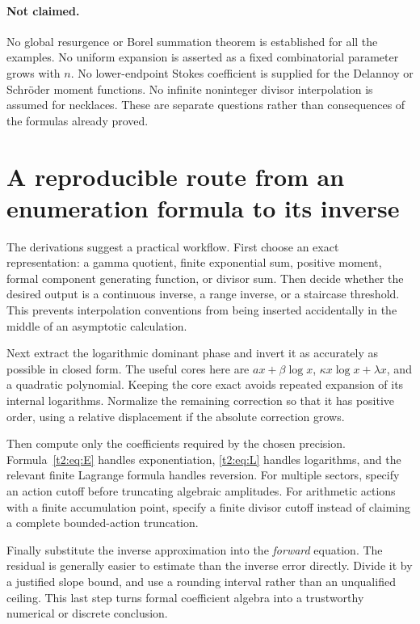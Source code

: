 \documentclass[11pt,openany]{book}
\numberwithin{equation}{chapter}
\theoremstyle{plain}
\theoremstyle{definition}
\theoremstyle{remark}
\begin{document}
\paragraph{Not claimed.}
No global resurgence or Borel summation theorem is established for all the examples. No uniform expansion is asserted as a fixed combinatorial parameter grows with $n$. No lower-endpoint Stokes coefficient is supplied for the Delannoy or Schr\"oder moment functions. No infinite noninteger divisor interpolation is assumed for necklaces. These are separate questions rather than consequences of the formulas already proved.

\section{A reproducible route from an enumeration formula to its inverse}

The derivations suggest a practical workflow. First choose an exact representation: a gamma quotient, finite exponential sum, positive moment, formal component generating function, or divisor sum. Then decide whether the desired output is a continuous inverse, a range inverse, or a staircase threshold. This prevents interpolation conventions from being inserted accidentally in the middle of an asymptotic calculation.

Next extract the logarithmic dominant phase and invert it as accurately as possible in closed form. The useful cores here are $ax+\beta\log x$, $\kappa x\log x+\lambda x$, and a quadratic polynomial. Keeping the core exact avoids repeated expansion of its internal logarithms. Normalize the remaining correction so that it has positive order, using a relative displacement if the absolute correction grows.

Then compute only the coefficients required by the chosen precision. Formula~\eqref{t2:eq:E} handles exponentiation, \eqref{t2:eq:L} handles logarithms, and the relevant finite Lagrange formula handles reversion. For multiple sectors, specify an action cutoff before truncating algebraic amplitudes. For arithmetic actions with a finite accumulation point, specify a finite divisor cutoff instead of claiming a complete bounded-action truncation.

Finally substitute the inverse approximation into the \emph{forward} equation. The residual is generally easier to estimate than the inverse error directly. Divide it by a justified slope bound, and use a rounding interval rather than an unqualified ceiling. This last step turns formal coefficient algebra into a trustworthy numerical or discrete conclusion.
\end{document}
